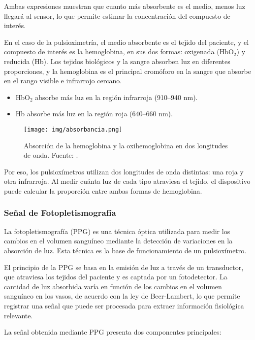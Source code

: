 Ambas expresiones muestran que cuanto más absorbente es el medio, menos luz llegará al sensor, lo que permite estimar la concentración del compuesto de interés. 

En el caso de la pulsioximetría, el medio absorbente es el tejido del paciente, y el compuesto de interés es la hemoglobina, en sus dos formas: oxigenada (HbO$_2$) y reducida (Hb). Los tejidos biológicos y la sangre absorben luz en diferentes proporciones, y la hemoglobina es el principal cromóforo en la sangre que absorbe en el rango visible e infrarrojo cercano.

\begin{itemize}
    \item HbO$_2$ absorbe más luz en la región infrarroja (910–940 nm).
    \item Hb absorbe más luz en la región roja (640–660 nm).
\end{itemize}

\begin{figure}[H]
    \centering
    \texttt{[image: img/absorbancia.png]}
    \caption{Absorción de la hemoglobina y la oxihemoglobina en dos longitudes de onda. Fuente: \cite{DeLaPena2017}.}
    \label{fig:absorbancia}
\end{figure}

Por eso, los pulsioxímetros utilizan dos longitudes de onda distintas: una roja y otra infrarroja. Al medir cuánta luz de cada tipo atraviesa el tejido, el dispositivo puede calcular la proporción entre ambas formas de hemoglobina. 


\subsubsection{Señal de Fotopletismografía}

La fotopletismografía (PPG) es una técnica óptica utilizada para medir los cambios en el volumen sanguíneo mediante la detección de variaciones en la absorción de luz. Esta técnica es la base de funcionamiento de un pulsioxímetro. 

El principio de la PPG se basa en la emisión de luz a través de un transductor, que atraviesa los tejidos del paciente y es captada por un fotodetector. La cantidad de luz absorbida varía en función de los cambios en el volumen sanguíneo en los vasos, de acuerdo con la ley de Beer-Lambert, lo que permite registrar una señal que puede ser procesada para extraer información fisiológica relevante.

La señal obtenida mediante PPG presenta dos componentes principales: 

